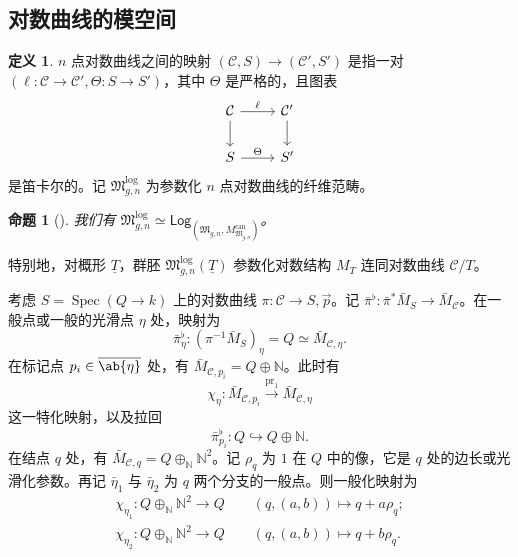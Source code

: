 \documentclass{amsart}
\newtheorem{prop}[thm]{命题}
\theoremstyle{definition}
\newtheorem{defn}[thm]{定义}
\theoremstyle{remark}
\theoremstyle{plain}
\theoremstyle{definition}
\theoremstyle{remark}
\newcommand{\N}{\mathbb{N}}
\newcommand{\mc}[1]{\mathcal{#1}}
\newcommand{\mf}[1]{\mathfrak{#1}}
\newcommand{\on}[1]{\operatorname{#1}}
\newcommand{\ms}[1]{\mathsf{#1}}
\newcommand{\ol}[1]{\overline{#1}}
\newcommand{\ul}[1]{\underline{#1}}
\newcommand{\1}{\mathbf{1}}
\newcommand{\2}{\mathbf{2}}
\newcommand{\3}{\mathbf{3}}
\DeclareMathOperator{\Spec}{Spec}
\begin{document}
\subsection{对数曲线的模空间}%
\label{sub:Moduli of log curves}

\begin{defn}
    \(n\) 点对数曲线之间的映射 \((\mc{C}, S) \to (\mc{C}', S')\) 是指一对 \((\ell \colon \mc{C} \to \mc{C}', \Theta \colon S \to S')\)，其中 \(\Theta\) 是严格的，且图表
    \begin{equation*}
    \begin{tikzcd}
        \mc{C} \ar{d} \ar{r}{\ell} & \mc{C}' \ar{d} \\
        S \ar{r}{\Theta} & S'
    \end{tikzcd}
    \end{equation*}
    是笛卡尔的。记 \(\mf{M}_{g,n}^{\log}\) 为参数化 \(n\) 点对数曲线的纤维范畴。
\end{defn}

\begin{prop}[{\cite{FKato2000,Olsson2003}}]
    我们有 \(\mf{M}_{g,n}^{\log} \simeq \ms{Log}_{(\mf{M}_{g,n}, M_{\mf{M}_{g,n}}^{\on{can}})}\)。
\end{prop}

特别地，对概形 \(\ul{T}\)，群胚 \(\mf{M}_{g,n}^{\log}(\ul{T})\) 参数化对数结构 \(M_T\) 连同对数曲线 \(\mc{C} / T\)。

考虑 \(S = \Spec (Q \to k)\) 上的对数曲线 \(\pi \colon \mc{C} \to S, \vec{p}\)。记 \(\bar{\pi}^{\flat} \colon \bar{\pi}^* \bar{M}_S \to \bar{M}_{\mc{C}}\)。在一般点或一般的光滑点 \(\eta\) 处，映射为
\[ \bar{\pi}_{\eta}^{\flat} \colon (\pi^{-1} \bar{M}_S)_{\eta} = Q \simeq \bar{M}_{\mc{C}, \eta}. \]
在标记点 \(p_i \in \ol{\ab\{\eta\}}\) 处，有 \(\bar{M}_{\mc{C}, p_i} = Q \oplus \N\)。此时有
\[ \chi_{\eta} \colon \bar{M}_{\mc{C}, p_i} \xrightarrow{\on{pr}_1} \bar{M}_{\mc{C}, \eta} \]
这一特化映射，以及拉回
\[ \bar{\pi}_{p_i}^{\flat} \colon Q \hookrightarrow Q \oplus \N. \]
在结点 \(q\) 处，有 \(\bar{M}_{\mc{C}, q} = Q \oplus_{\N} \N^2\)。记 \(\rho_q\) 为 \(1\) 在 \(Q\) 中的像，它是 \(q\) 处的边长或光滑化参数。再记 \(\bar{\eta}_1\) 与 \(\bar{\eta}_2\) 为 \(q\) 两个分支的一般点。则一般化映射为
\begin{align*}
    \chi_{\eta_1} \colon Q \oplus_{\N} \N^2 \to Q \qquad (q, (a,b)) \mapsto q + a \rho_q ;\\
    \chi_{\eta_2} \colon Q \oplus_{\N} \N^2 \to Q \qquad (q, (a,b)) \mapsto q + b \rho_q .
\end{align*}
\end{document}
